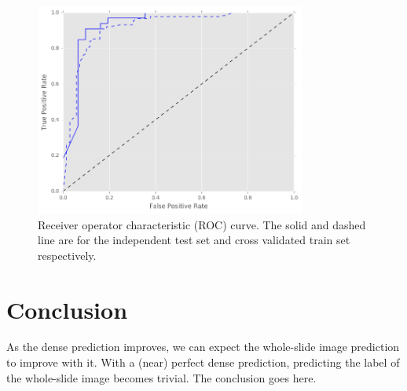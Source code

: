 \documentclass[journal]{IEEEtran}
\begin{document}
\begin{figure}[!t]
\centering{}
\hspace{-0.3cm}\includegraphics[width=3.5in]{roc}
\vspace{-0.35cm}\caption{Receiver operator characteristic (ROC) curve. The solid and dashed line are for the independent test set and cross validated train set respectively.}
\label{fig_roc}
\end{figure}

\section{Conclusion}



As the dense prediction improves, we can expect the whole-slide image prediction to improve with it. With a (near) perfect dense prediction, predicting the label of the whole-slide image becomes trivial.
The conclusion goes here.







%
\end{document}

